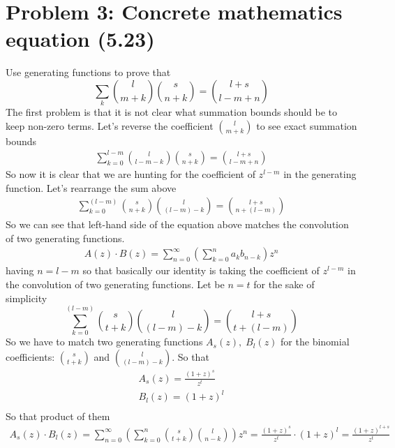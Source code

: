 ﻿\section{Problem 3: Concrete mathematics equation (5.23)}
\label{sec:problem-3:-concrete-mathematics-equation-(5.23)}
Use generating functions to prove that
\begin{equation}
    \sum_{k} \binom{l}{m+k} \binom{s}{n+k} = \binom{l+s}{l-m+n}
    \label{eq:identity-to-prove}
\end{equation}
The first problem is that it is not clear what summation bounds should be to keep non-zero terms.
Let's reverse the coefficient $\binom{l}{m+k}$ to see exact summation bounds
\begin{align*}
    \sum_{k=0}^{l-m} \binom{l}{l-m-k} \binom{s}{n+k} = \binom{l+s}{l-m+n}
\end{align*}
So now it is clear that we are hunting for the coefficient of $z^{l-m}$ in the generating function.
Let's rearrange the sum above
\begin{align*}
    \sum_{k=0}^{(l-m)} \binom{s}{n+k} \binom{l}{(l-m)-k} = \binom{l+s}{n+(l-m)}
\end{align*}
So we can see that left-hand side of the equation above matches the convolution of two generating functions.
\begin{align*}
    A(z) \cdot B(z) = \sum_{n=0}^{\infty} \left( \sum_{k=0}^{n} a_k b_{n-k} \right) z^n
\end{align*}
having $n=l-m$ so that basically our identity is taking the coefficient of $z^{l-m}$
in the convolution of two generating functions.
Let be $n=t$ for the sake of simplicity
\begin{equation}
    \sum_{k=0}^{(l-m)} \binom{s}{t+k} \binom{l}{(l-m)-k} = \binom{l+s}{t+(l-m)}
    \label{eq:identity-to-prove-2}
\end{equation}
So we have to match two generating functions $A_s(z), \; B_l(z)$ for
the binomial coefficients: $\binom{s}{t+k}$ and $\binom{l}{(l-m)-k}$.
So that
\begin{align*}
    A_s(z) = \frac{(1+z)^s}{z^t} \\
    B_l(z) = (1+z)^l \\
\end{align*}
So that product of them
\begin{align*}
    A_s(z) \cdot B_l(z) = \sum_{n=0}^{\infty} \left( \sum_{k=0}^{n} \binom{s}{t+k} \binom{l}{n-k} \right) z^n
    = \frac{(1+z)^s}{z^t} \cdot (1+z)^l = \frac{(1+z)^{l+s}}{z^t}
\end{align*}
